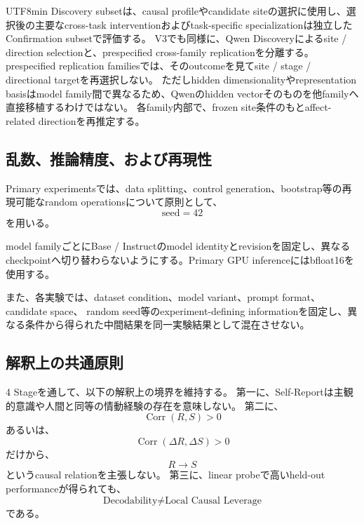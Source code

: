 \documentclass{article} %
\begin{document}
\begin{CJK*}{UTF8}{min}
Discovery subsetは、causal profileやcandidate siteの選択に使用し、選択後の主要なcross-task interventionおよびtask-specific specializationは独立したConfirmation subsetで評価する。
V3でも同様に、Qwen Discoveryによるsite / direction selectionと、prespecified cross-family replicationを分離する。prespecified replication familiesでは、そのoutcomeを見てsite / stage / directional targetを再選択しない。
ただしhidden dimensionalityやrepresentation basisはmodel family間で異なるため、Qwenのhidden vectorそのものを他familyへ直接移植するわけではない。
各family内部で、frozen site条件のもとaffect-related directionを再推定する。


\subsection{乱数、推論精度、および再現性}
\label{app:reproducibility_common}

Primary experimentsでは、data splitting、control generation、bootstrap等の再現可能なrandom operationsについて原則として、
\[
\text{seed}=42
\]
を用いる。

model familyごとにBase / Instructのmodel identityとrevisionを固定し、異なるcheckpointへ切り替わらないようにする。Primary GPU inferenceにはbfloat16を使用する。

また、各実験では、dataset condition、model variant、prompt format、candidate space、
random seed等のexperiment-defining informationを固定し、異なる条件から得られた中間結果を同一実験結果として混在させない。


\subsection{解釈上の共通原則}
\label{app:interpretation_principles}

4 Stageを通して、以下の解釈上の境界を維持する。
第一に、Self-Reportは主観的意識や人間と同等の情動経験の存在を意味しない。
第二に、
\[
\operatorname{Corr}(R,S)>0
\]
あるいは、
\[
\operatorname{Corr}(\Delta R,\Delta S)>0
\]
だけから、
\[
R\rightarrow S
\]
というcausal relationを主張しない。
第三に、linear probeで高いheld-out performanceが得られても、
\[
\text{Decodability}
\neq
\text{Local Causal Leverage}
\]
である。


\end{CJK*}
\end{document}
